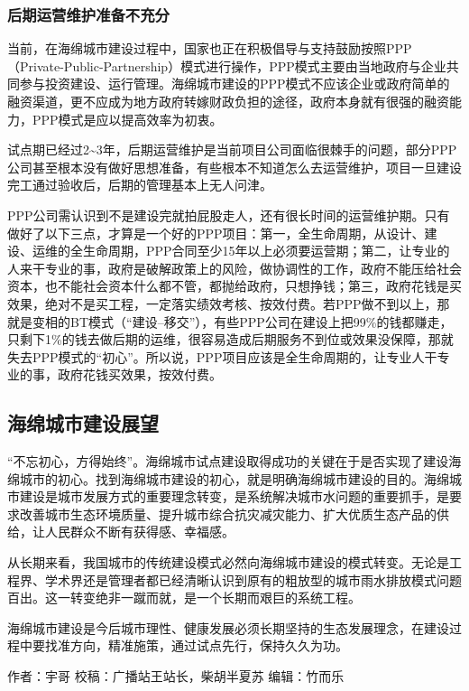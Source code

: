 \documentclass[]{book}
\begin{document}
\subsubsection{后期运营维护准备不充分}

当前，在海绵城市建设过程中，国家也正在积极倡导与支持鼓励按照PPP（Private-Public-Partnership）模式进行操作，PPP模式主要由当地政府与企业共同参与投资建设、运行管理。海绵城市建设的PPP模式不应该企业或政府简单的融资渠道，更不应成为地方政府转嫁财政负担的途径，政府本身就有很强的融资能力，PPP模式是应以提高效率为初衷。

试点期已经过2\textasciitilde{}3年，后期运营维护是当前项目公司面临很棘手的问题，部分PPP公司甚至根本没有做好思想准备，有些根本不知道怎么去运营维护，项目一旦建设完工通过验收后，后期的管理基本上无人问津。

PPP公司需认识到不是建设完就拍屁股走人，还有很长时间的运营维护期。只有做好了以下三点，才算是一个好的PPP项目：第一，全生命周期，从设计、建设、运维的全生命周期，PPP合同至少15年以上必须要运营期；第二，让专业的人来干专业的事，政府是破解政策上的风险，做协调性的工作，政府不能压给社会资本，也不能社会资本什么都不管，都抛给政府，只想挣钱；第三，政府花钱是买效果，绝对不是买工程，一定落实绩效考核、按效付费。若PPP做不到以上，那就是变相的BT模式（``建设--移交''），有些PPP公司在建设上把99\%的钱都赚走，只剩下1\%的钱去做后期的运维，很容易造成后期服务不到位或效果没保障，那就失去PPP模式的``初心''。所以说，PPP项目应该是全生命周期的，让专业人干专业的事，政府花钱买效果，按效付费。

\subsection{海绵城市建设展望}

``不忘初心，方得始终''。海绵城市试点建设取得成功的关键在于是否实现了建设海绵城市的初心。找到海绵城市建设的初心，就是明确海绵城市建设的目的。海绵城市建设是城市发展方式的重要理念转变，是系统解决城市水问题的重要抓手，是要求改善城市生态环境质量、提升城市综合抗灾减灾能力、扩大优质生态产品的供给，让人民群众不断有获得感、幸福感。

从长期来看，我国城市的传统建设模式必然向海绵城市建设的模式转变。无论是工程界、学术界还是管理者都已经清晰认识到原有的粗放型的城市雨水排放模式问题百出。这一转变绝非一蹴而就，是一个长期而艰巨的系统工程。

海绵城市建设是今后城市理性、健康发展必须长期坚持的生态发展理念，在建设过程中要找准方向，精准施策，通过试点先行，保持久久为功。

作者：宇哥 校稿：广播站王站长，柴胡半夏苏 编辑：竹而乐
\end{document}
